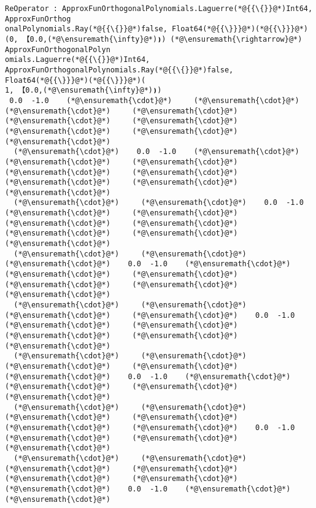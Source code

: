 \documentclass[12pt,a4paper]{article}
\begin{document}
\begin{lstlisting}
ReOperator : ApproxFunOrthogonalPolynomials.Laguerre(*@{{\{}}@*)Int64, ApproxFunOrthog
onalPolynomials.Ray(*@{{\{}}@*)false, Float64(*@{{\}}}@*)(*@{{\}}}@*)(0, 【0.0,(*@\ensuremath{\infty}@*)❫) (*@\ensuremath{\rightarrow}@*) ApproxFunOrthogonalPolyn
omials.Laguerre(*@{{\{}}@*)Int64, ApproxFunOrthogonalPolynomials.Ray(*@{{\{}}@*)false, Float64(*@{{\}}}@*)(*@{{\}}}@*)(
1, 【0.0,(*@\ensuremath{\infty}@*)❫)
 0.0  -1.0    (*@\ensuremath{\cdot}@*)     (*@\ensuremath{\cdot}@*)     (*@\ensuremath{\cdot}@*)     (*@\ensuremath{\cdot}@*)     (*@\ensuremath{\cdot}@*)     (*@\ensuremath{\cdot}@*)     (*@\ensuremath{\cdot}@*)     (*@\ensuremath{\cdot}@*)   (*@\ensuremath{\cdot}@*)
  (*@\ensuremath{\cdot}@*)    0.0  -1.0    (*@\ensuremath{\cdot}@*)     (*@\ensuremath{\cdot}@*)     (*@\ensuremath{\cdot}@*)     (*@\ensuremath{\cdot}@*)     (*@\ensuremath{\cdot}@*)     (*@\ensuremath{\cdot}@*)     (*@\ensuremath{\cdot}@*)   (*@\ensuremath{\cdot}@*)
  (*@\ensuremath{\cdot}@*)     (*@\ensuremath{\cdot}@*)    0.0  -1.0    (*@\ensuremath{\cdot}@*)     (*@\ensuremath{\cdot}@*)     (*@\ensuremath{\cdot}@*)     (*@\ensuremath{\cdot}@*)     (*@\ensuremath{\cdot}@*)     (*@\ensuremath{\cdot}@*)   (*@\ensuremath{\cdot}@*)
  (*@\ensuremath{\cdot}@*)     (*@\ensuremath{\cdot}@*)     (*@\ensuremath{\cdot}@*)    0.0  -1.0    (*@\ensuremath{\cdot}@*)     (*@\ensuremath{\cdot}@*)     (*@\ensuremath{\cdot}@*)     (*@\ensuremath{\cdot}@*)     (*@\ensuremath{\cdot}@*)   (*@\ensuremath{\cdot}@*)
  (*@\ensuremath{\cdot}@*)     (*@\ensuremath{\cdot}@*)     (*@\ensuremath{\cdot}@*)     (*@\ensuremath{\cdot}@*)    0.0  -1.0    (*@\ensuremath{\cdot}@*)     (*@\ensuremath{\cdot}@*)     (*@\ensuremath{\cdot}@*)     (*@\ensuremath{\cdot}@*)   (*@\ensuremath{\cdot}@*)
  (*@\ensuremath{\cdot}@*)     (*@\ensuremath{\cdot}@*)     (*@\ensuremath{\cdot}@*)     (*@\ensuremath{\cdot}@*)     (*@\ensuremath{\cdot}@*)    0.0  -1.0    (*@\ensuremath{\cdot}@*)     (*@\ensuremath{\cdot}@*)     (*@\ensuremath{\cdot}@*)   (*@\ensuremath{\cdot}@*)
  (*@\ensuremath{\cdot}@*)     (*@\ensuremath{\cdot}@*)     (*@\ensuremath{\cdot}@*)     (*@\ensuremath{\cdot}@*)     (*@\ensuremath{\cdot}@*)     (*@\ensuremath{\cdot}@*)    0.0  -1.0    (*@\ensuremath{\cdot}@*)     (*@\ensuremath{\cdot}@*)   (*@\ensuremath{\cdot}@*)
  (*@\ensuremath{\cdot}@*)     (*@\ensuremath{\cdot}@*)     (*@\ensuremath{\cdot}@*)     (*@\ensuremath{\cdot}@*)     (*@\ensuremath{\cdot}@*)     (*@\ensuremath{\cdot}@*)     (*@\ensuremath{\cdot}@*)    0.0  -1.0    (*@\ensuremath{\cdot}@*)   (*@\ensuremath{\cdot}@*)

\end{lstlisting}
\end{document}
